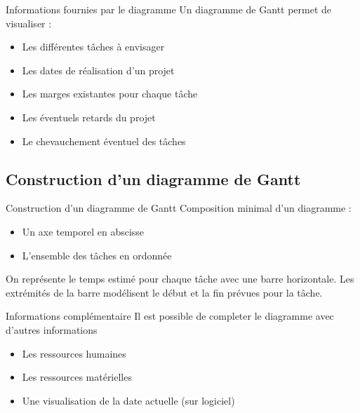 \documentclass[handout]{beamer}
\begin{document}
\begin{frame}{Informations fournies par le diagramme}
  Un diagramme de Gantt permet de visualiser :
  \begin{itemize}
  \item {Les différentes tâches à envisager}
  \item {Les dates de réalisation d'un projet}
  \item {Les marges existantes pour chaque tâche}
  \item {Les éventuels retards du projet}
  \item {Le chevauchement éventuel des tâches}
  \end{itemize}
\end{frame}


\subsection{Construction d'un diagramme de Gantt}

\begin{frame}{Construction d'un diagramme de Gantt}
    Composition minimal d'un diagramme :
    \begin{itemize}
    \item {Un axe temporel en abscisse}
    \item {L'ensemble des tâches en ordonnée}
    \end{itemize}
     On représente le temps estimé pour chaque tâche avec une barre horizontale. \newline{}
    Les extrémités de la barre modélisent le début et la fin prévues pour la tâche.
\end{frame}

\begin{frame}{Informations complémentaire}
    Il est possible de completer le diagramme avec d'autres informations
	\begin{itemize}
		\item {Les ressources humaines}
		\item {Les ressources matérielles }
		\item {Une visualisation de la date actuelle (sur logiciel)}
	\end{itemize}
\end{frame}
\end{document}
